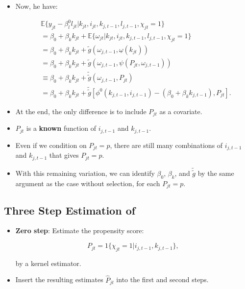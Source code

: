 \documentclass[]{book}
\providecommand{\tightlist}{%
  \setlength{\itemsep}{0pt}\setlength{\parskip}{0pt}}
\begin{document}
\begin{itemize}
\tightlist
\item
  Now, he have:

  \begin{equation}
  \begin{split}
  &\mathbb{E}\{y_{jt} - \beta_l^0 l_{jt}|k_{jt}, i_{jt}, k_{j, t - 1}, l_{j, t - 1}, \chi_{jt} = 1\} \\
  &= \beta_0 + \beta_k k_{jt} + \mathbb{E}\{\omega_{jt}| k_{jt}, i_{jt}, k_{j, t - 1}, l_{j, t - 1} , \chi_{jt} = 1\}\\
  &= \beta_0 + \beta_k k_{jt} + \tilde{g}(\omega_{j, t - 1}, \underline{\omega}(k_{jt}))\\
  &= \beta_0 + \beta_k k_{jt} + \tilde{g}(\omega_{j, t - 1}, \psi(P_{jt}, \omega_{j, t - 1}))\\
  &\equiv \beta_0 + \beta_k k_{jt} + \tilde{\tilde{g}}(\omega_{j, t - 1}, P_{jt})\\
  &= \beta_0 + \beta_k k_{jt} + \tilde{\tilde{g}}[\phi^0(k_{j, t - 1}, i_{j, t - 1}) - (\beta_0 + \beta_k k_{j, t - 1}), P_{jt}].
  \end{split}
  \end{equation}
\item
  At the end, the only difference is to include \(P_{jt}\) as a
  covariate.
\item
  \(P_{jt}\) is a \textbf{known} function of \(i_{j, t - 1}\) and
  \(k_{j, t - 1}\).
\item
  Even if we condition on \(P_{jt} = p\), there are still many
  combinations of \(i_{j, t - 1}\) and \(k_{j, t - 1}\) that gives
  \(P_{jt} = p\).
\item
  With this remaining variation, we can identify \(\beta_0\),
  \(\beta_k\), and \(\tilde{\tilde{g}}\) by the same argument as the
  case without selection, for each \(P_{jt} = p\).
\end{itemize}

\subsection{\texorpdfstring{Three Step Estimation of
\citet{Olley1996}}{Three Step Estimation of @Olley1996}}\label{three-step-estimation-of-olley1996}

\begin{itemize}
\tightlist
\item
  \textbf{Zero step}: Estimate the propensity score:

  \begin{equation}
  P_{jt} = 1\{\chi_{jt} = 1| i_{j, t - 1}, k_{j, t - 1}\},
  \end{equation}

  by a kernel estimator.
\item
  Insert the resulting estimates \(\widehat{P}_{jt}\) into the first and
  second steps.
\end{itemize}
\end{document}
